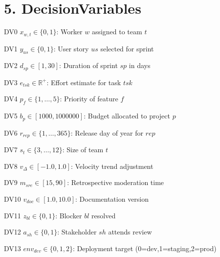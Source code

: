 \documentclass[12pt]{article}
\begin{document}
\section{5. DecisionVariables}
\item[DV0] $ x_{w,t} \in \{0,1\} $: Worker $ w $ assigned to team $ t $
    \item[DV1] $ y_{us} \in \{0,1\} $: User story $ us $ selected for sprint
    \item[DV2] $ d_{sp} \in [1,30] $: Duration of sprint $ sp $ in days
    \item[DV3] $ e_{tsk} \in \mathbb{R}^+ $: Effort estimate for task $ tsk $
    \item[DV4] $ p_f \in \{1,\dots,5\} $: Priority of feature $ f $
    \item[DV5] $ b_p \in [1000, 1000000] $: Budget allocated to project $ p $
    \item[DV6] $ r_{rep} \in \{1,\dots,365\} $: Release day of year for $ rep $
    \item[DV7] $ s_t \in \{3,\dots,12\} $: Size of team $ t $
    \item[DV8] $ v_{\Delta} \in [-1.0, 1.0] $: Velocity trend adjustment
    \item[DV9] $ m_{sre} \in [15,90] $: Retrospective moderation time
    \item[DV10] $ v_{doc} \in [1.0,10.0] $: Documentation version
    \item[DV11] $ z_{bl} \in \{0,1\} $: Blocker $ bl $ resolved
    \item[DV12] $ a_{sh} \in \{0,1\} $: Stakeholder $ sh $ attends review
    \item[DV13] $ env_{dev} \in \{0,1,2\} $: Deployment target (0=dev,1=staging,2=prod)
\end{document}
